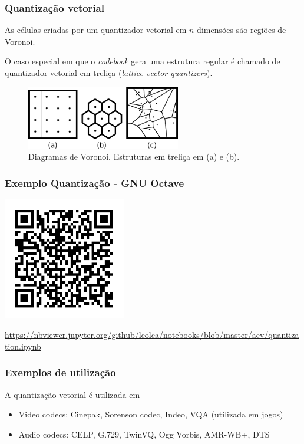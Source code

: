 \begin{frame}[allowframebreaks]
  \frametitle{Quantização vetorial}
  As células criadas por um quantizador vetorial em $n$-dimensões são regiões de Voronoi.

  O caso especial em que o \textit{codebook} gera uma estrutura regular é chamado 
  de quantizador vetorial em treliça (\textit{lattice vector quantizers}).

  \begin{figure}[h!]
  \centering
  \includegraphics[width=0.6\textwidth]{images/lattice.pdf}
  \caption{Diagramas de Voronoi. Estruturas em treliça em (a) e (b).}
  \label{fig:lattice}
  \end{figure} 
\end{frame}

\begin{frame}%
  \frametitle{Exemplo Quantização - GNU Octave}
  \centering
  \includegraphics[width=0.4\textwidth]{images/qrcode-jupyter-quantizacao.pdf}

  \url{https://nbviewer.jupyter.org/github/leolca/notebooks/blob/master/aev/quantization.ipynb}
\end{frame} 


\begin{frame}%
  \frametitle{Exemplos de utilização}
  A quantização vetorial é utilizada em
  \begin{itemize}
  \item Video codecs: Cinepak, Sorenson codec, Indeo, VQA (utilizada em jogos)
  \item Audio codecs: CELP, G.729, TwinVQ, Ogg Vorbis, AMR-WB+, DTS
  \end{itemize}
\end{frame}



